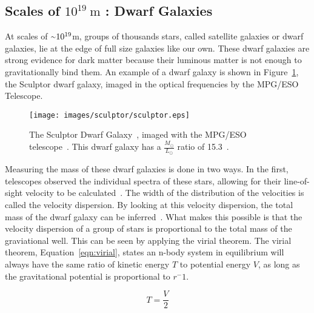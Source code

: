   \subsection{Scales of $10^{19}\:\text{m}$ : Dwarf Galaxies}\label{dm_dwarfscale}
    At scales of $\nicetilde 10^{19}$m, groups of thousands stars, called satellite galaxies or dwarf galaxies, lie at the edge of full size galaxies like our own.
    These dwarf galaxies are strong evidence for dark matter because their luminous matter is not enough to gravitationally bind them.
    An example of a dwarf galaxy is shown in Figure~\ref{fig:sculptor}, the Sculptor dwarf galaxy, imaged in the optical frequencies by the MPG/ESO Telescope.

    \begin{figure}[h]
      \centering
      \texttt{[image: images/sculptor/sculptor.eps]}
      \caption[Sculptor Dwarf Galaxy]{
        The Sculptor Dwarf Galaxy~\cite{sculptor_image}, imaged with the MPG/ESO telescope~\cite{sculptor_paper}.
        This dwarf galaxy has a $\frac{M_\odot}{L_\odot}$ ratio of 15.3~\cite{sculptor_ml}.
      }
      \label{fig:sculptor}
    \end{figure}

    Measuring the mass of these dwarf galaxies is done in two ways.
    In the first, telescopes observed the individual spectra of these stars, allowing for their line-of-sight velocity to be calculated~\cite{dwarf_gal_red_giant}.
    The width of the distribution of the velocities is called the velocity dispersion.
    By looking at this velocity dispersion, the total mass of the dwarf galaxy can be inferred~\cite{dwarf_gal_vel_dispersion, dwarf_gal_vel_dispersion2}.
    What makes this possible is that the velocity dispersion of a group of stars is proportional to the total mass of the graviational well.
    This can be seen by applying the virial theorem.
    The virial theorem, Equation~\ref{eqn:virial}, states an n-body system in equilibrium will always have the same ratio of kinetic energy $T$ to potential energy $V$, as long as the gravitational potential is proportional to $r^-1$.

    \begin{equation}\label{eqn:virial}
      T = \frac{V}{2}
    \end{equation}

